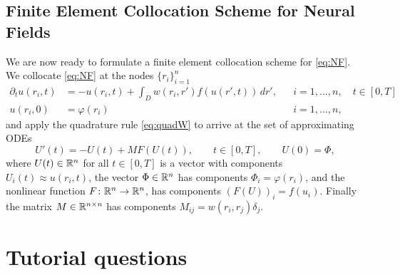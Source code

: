 \documentclass[a4paper]{siamonline220329}
\theoremstyle{plain}
\renewcommand\phi\varphi
\begin{document}
\subsection{Finite Element Collocation Scheme for Neural Fields}\label{ssec:scheme} 
We are now ready to formulate a finite element collocation scheme for \cref{eq:NF}.
We collocate \cref{eq:NF} at the nodes $\{ r_i \}_{i=1}^n$
\[
  \begin{aligned}
    \partial_{t} u(r_i,t) & = -u(r_i,t) + \int_{D} w(r_i,r') f(u(r',t))\,d r',
                        && i=1,\ldots,n, \quad t \in [0,T] \\
    u(r_i,0) & = \phi(r_i)
                        && i=1,\ldots,n,
  \end{aligned}
\]
and apply the quadrature rule \cref{eq:quadW} to arrive at the set of approximating ODEs
\begin{equation}\label{eq:ODE}
  U'(t) = -U(t) + MF(U(t)), \qquad t \in [0,T], \qquad U(0) = \Phi,
\end{equation}
where $U(t) \in \mathbb{R}^n$ for all $t \in [0,T]$ is a vector with components $U_i(t)
\approx u(r_i,t)$, the vector $\Phi \in \mathbb{R}^n$ has components $\Phi_i = \varphi(r_i)$, and the
nonlinear function $F \colon \mathbb{R}^n \to \mathbb{R}^n$, has components $(F(U))_i = f(u_i)$.
Finally the matrix $M \in \mathbb{R}^{n \times n}$ has components $M_{ij} =
w(r_i,r_j)\delta_j$.

\section{Tutorial questions}\label{sec:question} 
\end{document}
